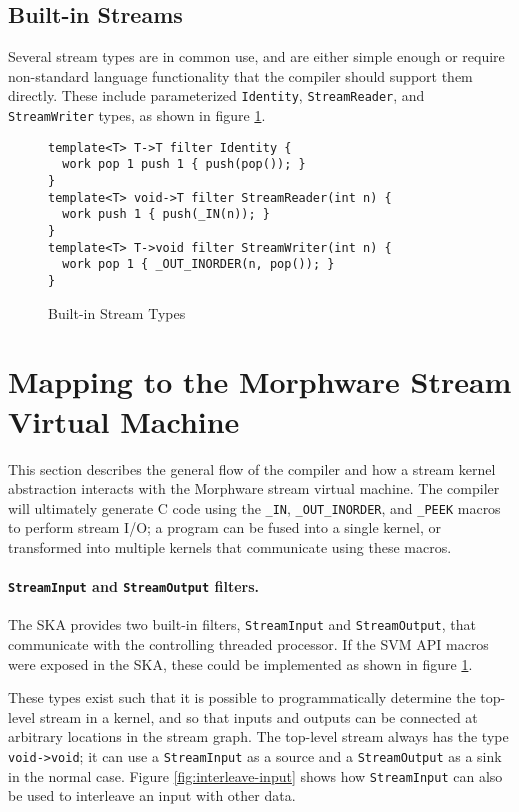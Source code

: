 \documentclass[11pt]{article}
\begin{document}
\subsection{Built-in Streams}
\label{sec:built-in-streams}

Several stream types are in common use, and are either simple enough
or require non-standard language functionality that the compiler
should support them directly.  These include parameterized
\texttt{Identity}, \texttt{StreamReader}, and \texttt{StreamWriter}
types, as shown in figure \ref{fig:built-in-streams}.

\begin{figure}[htbp]
    \begin{verbatim}
template<T> T->T filter Identity {
  work pop 1 push 1 { push(pop()); }
}
template<T> void->T filter StreamReader(int n) {
  work push 1 { push(_IN(n)); }
}
template<T> T->void filter StreamWriter(int n) {
  work pop 1 { _OUT_INORDER(n, pop()); }
}
\end{verbatim}
    \caption{Built-in Stream Types}
    \label{fig:built-in-streams}
\end{figure}

\section{Mapping to the Morphware Stream Virtual Machine}

This section describes the general flow of the compiler and how a
stream kernel abstraction interacts with the Morphware stream virtual
machine.  The compiler will ultimately generate C code using the
\texttt{\_IN}, \texttt{\_OUT\_INORDER}, and \texttt{\_PEEK} macros to
perform stream I/O; a program can be fused into a single kernel, or
transformed into multiple kernels that communicate using these macros.

\paragraph{\texttt{StreamInput} and \texttt{StreamOutput} filters.}
The SKA provides two built-in filters,
\texttt{StreamInput} and \texttt{StreamOutput}, that communicate with
the controlling threaded processor.  If the SVM API macros were exposed
in the SKA, these could be implemented as shown in figure
\ref{fig:built-in-streams}.

These types exist such that it is possible to programmatically
determine the top-level stream in a kernel, and so that inputs and
outputs can be connected at arbitrary locations in the stream graph.
The top-level stream always has the type \texttt{void->void}; it can
use a \texttt{StreamInput} as a source and a \texttt{StreamOutput} as
a sink in the normal case.  Figure \ref{fig:interleave-input} shows
how \texttt{StreamInput} can also be used to interleave an input with
other data.
\end{document}
